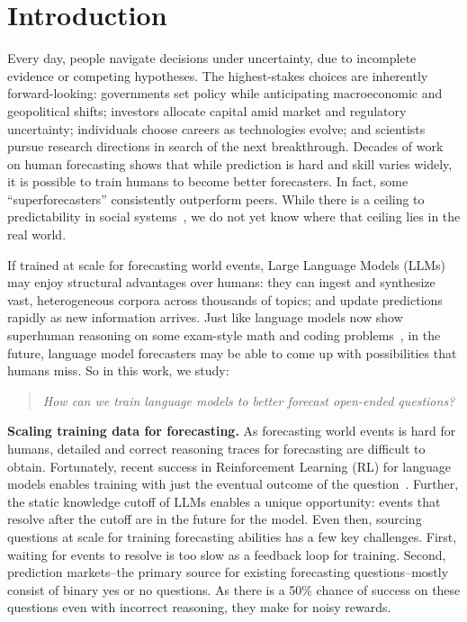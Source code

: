 \section{Introduction}

Every day, people navigate decisions under uncertainty, due to incomplete evidence or competing hypotheses. The highest-stakes choices are inherently forward-looking: governments set policy while anticipating macroeconomic and geopolitical shifts; investors allocate capital amid market and regulatory uncertainty; individuals choose careers as technologies evolve; and scientists pursue research directions in search of the next breakthrough. Decades of work~\citep{tetlock2014forecasting} on human forecasting shows that while prediction is hard and skill varies widely, it is possible to train humans to become better forecasters. In fact, some  ``superforecasters'' consistently outperform peers. While there is a ceiling to predictability in social systems~\citep{franklin1999real}, we do not yet know where that ceiling lies in the real world.

 If trained at scale for forecasting world events, Large Language Models (LLMs) may enjoy structural advantages over humans: they can ingest and synthesize vast, heterogeneous corpora across thousands of topics; and update predictions rapidly as new information arrives. Just like language models now show superhuman reasoning on some exam-style math and coding problems~\citep{icpc_openai_2025}, in the future, language model forecasters may be able to come up with possibilities that humans miss. So in this work, we study:

\begin{quote}
\emph{How can we train language models to better forecast open-ended questions?
}
\end{quote}

\textbf{Scaling training data for forecasting.} As forecasting world events is hard for humans, detailed and correct reasoning traces for forecasting are difficult to obtain. Fortunately, recent success in Reinforcement Learning (RL) for language models enables training with just the eventual outcome of the question~\citep{guo2025deepseek}. Further, the static knowledge cutoff of LLMs enables a unique opportunity: events that resolve after the cutoff are in the future for the model. Even then, sourcing questions at scale for training forecasting abilities has a few key challenges. First, waiting for events to resolve is too slow as a feedback loop for training. Second, prediction markets--the primary source for existing forecasting questions--mostly consist of binary yes or no questions. As there is a 50\% chance of success on these questions even with incorrect reasoning, they make for noisy rewards.

